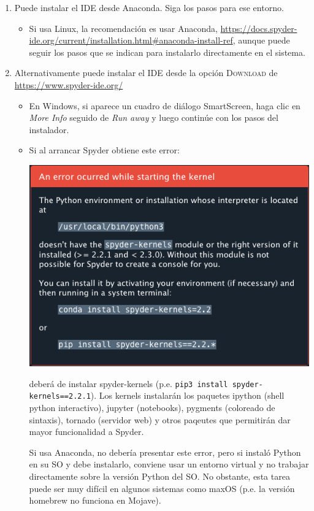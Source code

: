 \begin{enumerate}
\item Puede instalar el IDE desde Anaconda. Siga los pasos para ese entorno. 
\begin{itemize}
\item Si usa Linux, la recomendación es usar Anaconda, \url{https://docs.spyder-ide.org/current/installation.html#anaconda-install-ref}, aunque puede seguir los pasos que se indican para instalarlo directamente en el sistema.
\end{itemize}

\item Alternativamente puede instalar el IDE desde la opción \textsc{Download} de \url{https://www.spyder-ide.org/}
\begin{itemize}
\item En Windows, si aparece un cuadro de diálogo SmartScreen, haga clic en \textit{More Info} seguido de \textit{Run away} y luego continúe con los pasos del instalador.

\item Si al arrancar Spyder obtiene este error: 

\centerline{\includegraphics[width=.5\textwidth]{error-spyder}}

deberá de instalar spyder-kernels (p.e. \texttt{pip3 install spyder-kernels==2.2.1}). Los kernels instalarán los paquetes ipython (shell python interactivo), jupyter  (notebooks), pygments (coloreado de sintaxis), tornado (servidor web) y otros paqeutes que permitirán dar mayor funcionalidad a Spyder.

Si usa Anaconda, no debería presentar este error, pero si instaló Python en su SO y debe instalarlo, conviene usar un entorno virtual y no trabajar directamente sobre la versión Python del SO. No obstante, esta tarea puede ser muy difícil en algunos sistemas como maxOS (p.e. la versión homebrew no funciona en Mojave).

\end{itemize}


\end{enumerate}




